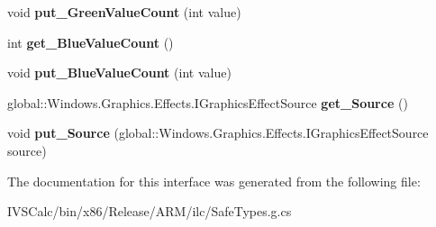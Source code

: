 \begin{DoxyCompactItemize}
void {\bfseries put\+\_\+\+Green\+Value\+Count} (int value)
\item 
\mbox{\label{interface_microsoft_1_1_graphics_1_1_canvas_1_1_effects_1_1_i_posterize_effect_a2b8b4bb5ea06b55ec3fcbc262748c566}} 
int {\bfseries get\+\_\+\+Blue\+Value\+Count} ()
\item 
\mbox{\label{interface_microsoft_1_1_graphics_1_1_canvas_1_1_effects_1_1_i_posterize_effect_acb054082d410566df8555984b43083e3}} 
void {\bfseries put\+\_\+\+Blue\+Value\+Count} (int value)
\item 
\mbox{\label{interface_microsoft_1_1_graphics_1_1_canvas_1_1_effects_1_1_i_posterize_effect_ad8560a10045dace88399b7e9cfa15ee8}} 
global\+::\+Windows.\+Graphics.\+Effects.\+I\+Graphics\+Effect\+Source {\bfseries get\+\_\+\+Source} ()
\item 
\mbox{\label{interface_microsoft_1_1_graphics_1_1_canvas_1_1_effects_1_1_i_posterize_effect_a543f2c579f0144304e21973d15de997a}} 
void {\bfseries put\+\_\+\+Source} (global\+::\+Windows.\+Graphics.\+Effects.\+I\+Graphics\+Effect\+Source source)
\end{DoxyCompactItemize}


The documentation for this interface was generated from the following file\+:\begin{DoxyCompactItemize}
\item 
I\+V\+S\+Calc/bin/x86/\+Release/\+A\+R\+M/ilc/Safe\+Types.\+g.\+cs\end{DoxyCompactItemize}
